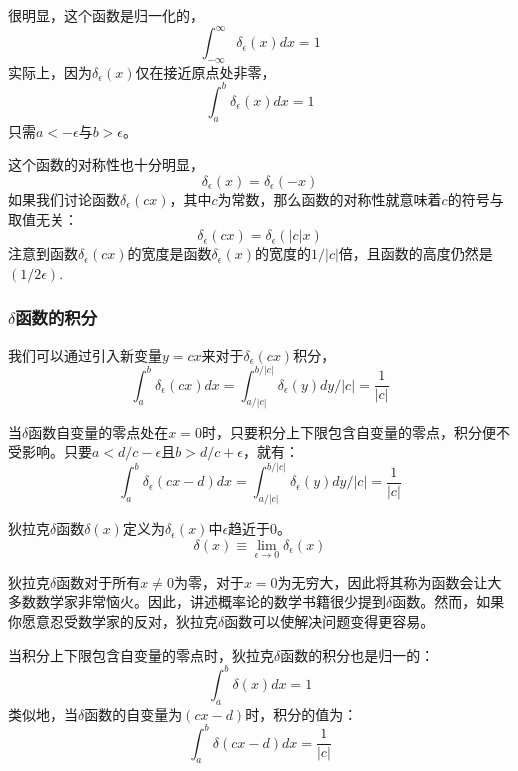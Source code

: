 \documentclass[UTF8]{ctexart}
\numberwithin{equation}{section}%
\numberwithin{figure}{section}%
\begin{document}
    很明显，这个函数是归一化的，
    \begin{equation}
        \int_{-\infty}^{\infty} \delta_{\epsilon}(x) d x=1
    \end{equation}
    实际上，因为$\delta_\epsilon(x)$仅在接近原点处非零，
    \begin{equation}
        \int_{a}^{b} \delta_{\epsilon}(x) d x=1
    \end{equation}
    只需$a<-\epsilon$与$b>\epsilon$。

    这个函数的对称性也十分明显，
    \begin{equation}
        \delta_{\epsilon}(x)=\delta_{\epsilon}(-x)
    \end{equation}
    如果我们讨论函数$\delta_\epsilon(cx)$，其中$c$为常数，那么函数的对称性就意味着$c$的符号与取值无关：
    \begin{equation}
        \delta_{\epsilon}(c x)=\delta_{\epsilon}(|c| x)
    \end{equation}
    注意到函数$\delta_\epsilon(cx)$的宽度是函数$\delta_\epsilon(x)$的宽度的$1/|c|$倍，且函数的高度仍然是$(1/2\epsilon)$.
    \subsubsection{\texorpdfstring{$\delta$函数的积分}{delta函数的积分}}
    我们可以通过引入新变量$y=cx$来对于$\delta_\epsilon(cx)$积分，
    \begin{equation}
        \int_{a}^{b} \delta_{\epsilon}(c x) d x=\int_{a /|c|}^{b /|c|} \delta_{\epsilon}(y) d y /|c|=\frac{1}{|c|}
    \end{equation}
    
    当$\delta$函数自变量的零点处在$x=0$时，只要积分上下限包含自变量的零点，积分便不受影响。只要$a<d/c-\epsilon$且$b>d/c+\epsilon$，就有：
    \begin{equation}
        \int_{a}^{b} \delta_{\epsilon}(c x-d) d x=\int_{a /|c|}^{b /|c|} \delta_{\epsilon}(y) d y /|c|=\frac{1}{|c|}
    \end{equation}

    狄拉克$\delta$函数$\delta(x)$定义为$\delta_\epsilon(x)$中$\epsilon$趋近于0。
    \begin{equation}
        \delta(x) \equiv \lim _{\epsilon \rightarrow 0} \delta_{\epsilon}(x)
    \end{equation}
    \begin{mdframed}[backgroundcolor=lightgray,hidealllines=true]
        狄拉克$\delta$函数对于所有$x\neq 0 $为零，对于$x=0$为无穷大，因此将其称为函数会让大多数数学家非常恼火。因此，讲述概率论的数学书籍很少提到$\delta$函数。然而，如果你愿意忍受数学家的反对，狄拉克$\delta$函数可以使解决问题变得更容易。
    \end{mdframed}
    当积分上下限包含自变量的零点时，狄拉克$\delta$函数的积分也是归一的：
    \begin{equation}
        \int_{a}^{b} \delta(x) d x=1
    \end{equation}
    类似地，当$\delta$函数的自变量为$(cx-d)$时，积分的值为：
    \begin{equation}
        \int_{a}^{b} \delta(c x-d) d x=\frac{1}{|c|}
        \end{equation}
\end{document}
